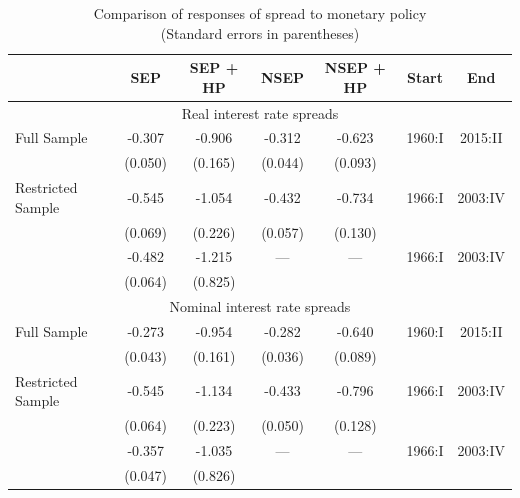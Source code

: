 \begin{table}[h]
\centering
\caption{Comparison of responses of spread to monetary policy \\ (Standard errors in parentheses)}
\label{spread-comparison-nipa}
\begin{tabular}{lcccccc} \hline
                   & SEP     & SEP + HP & NSEP    & NSEP + HP & Start  & End \\ \hline
\multicolumn{7}{c}{Real interest rate spreads} \\ \hline
Full Sample        & -0.307  & -0.906   & -0.312  & -0.623    & 1960:I & 2015:II \\
                   & (0.050) & (0.165)  & (0.044) & (0.093) \\
Restricted Sample  & -0.545  & -1.054   & -0.432  & -0.734    & 1966:I & 2003:IV \\
                   & (0.069) & (0.226)  & (0.057) & (0.130) \\
\cite{canzoneri07} & -0.482  & -1.215   & ---     & ---       & 1966:I & 2003:IV \\ 
                   & (0.064) & (0.825) \\\hline
\multicolumn{7}{c}{Nominal interest rate spreads} \\ \hline
Full Sample        & -0.273  & -0.954   & -0.282  & -0.640    & 1960:I & 2015:II \\
                   & (0.043) & (0.161)  & (0.036) & (0.089) \\
Restricted Sample  & -0.545  & -1.134   & -0.433  & -0.796    & 1966:I & 2003:IV \\
                   & (0.064) & (0.223)  & (0.050) & (0.128) \\
\cite{canzoneri07} & -0.357  & -1.035   & ---   & ---       & 1966:I & 2003:IV \\ 
                   & (0.047) & (0.826) \\\hline
\end{tabular}
\end{table}

